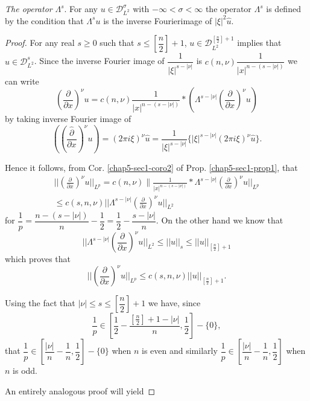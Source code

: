 \begin{defi*}
{\em The operator} $\Lambda^s$. For any $u \in 
\mathscr{D}^\sigma_{L^2}$ with $-\infty < \sigma < \infty$ the
operator $\Lambda^s$ is defined by the condition that $\Lambda^s u$ is
the inverse Fourier\pageoriginale image of $| \xi |^2 \hat{u}$. 
\end{defi*}

\begin{proof}
For any real $s \geq 0$ such that $s \leq \left[\dfrac{n}{2}\right]+ 1$, $u
\in \mathscr{D}^{[\frac{n}{2}]+1}_{L^2}$ implies that $u
\in \mathscr{D}^s_{L^2}$. Since the inverse Fourier image of
$\dfrac{1}{|\xi|^{s-| \nu |}}$ is $c(n, \nu)
\dfrac{1}{|x|^{n-(s-|\nu|)}}$ we can write   
$$
\left(\frac{\partial}{\partial x}\right)^\nu u = c(n, \nu)
\frac{1}{|x|^{n-(s-|\nu |)}}*
\left(\Lambda^{s-|\nu|}\left(\frac{\partial}{\partial x}\right)^\nu u\right)  
$$
by taking inverse Fourier image of 
$$
\left(\left( \frac{\widehat{\partial}}{\partial x}\right)^\nu u\right)
= 
(2 \pi i \xi)^\nu
\hat{u} = \frac{1}{| \xi|^{s-| \nu |}} \{ | \xi |^{s-| \nu |}(2 \pi i
\xi)^\nu \hat{u} \}. 
$$

Hence it follows, from Cor. \ref{chap5-sec1-coro2} of
Prop. \ref{chap5-sec1-prop1}, that 
\begin{gather*}
|| \left(\frac{\partial}{\partial x}\right)^\nu u ||_{L^p} = c(n, \nu )\|
\frac{1}{|x|^{n-(s-| \nu |)}}* \Lambda^{s-|\nu|}\left(\frac{\partial}{\partial
  x}\right)^\nu u||_{L^p}\\  
\leq c(s,n, \nu ) || \Lambda^{s-| \nu |}\left(\frac{\partial}{\partial
  x}\right)^\nu u ||_{L^2}  
\end{gather*}
for $\dfrac{1}{p} = \dfrac{n-(s-|\nu|)}{n} - \dfrac{1}{2}=
\dfrac{1}{2}- \dfrac{s-|\nu|}{n}$. On the other hand we know that 
$$
|| \Lambda^{s-|\nu|}\left(\frac{\partial}{\partial x}\right)^\nu u ||_{L^2} \leq
|| u ||_s \leq || u ||_{[\frac{n}{2}]+1} 
$$
which proves that 
$$
|| \left(\frac{\partial}{\partial x}\right)^\nu u ||_{L^p} \leq c(s, n, \nu)||
u||_{[\frac{n}{2}]+1}. 
$$

Using the fact that $|\nu|\leq s \leq \left[\dfrac{n}{2}\right]+1$ we have,
since 
$$
\frac{1}{p}\in \left[ \frac{1}{2}- \frac{[\frac{n}{2}]+1-|\nu 
    |}{n}, \frac{1}{2}\right]- \{0\}, 
$$\pageoriginale
that $ \dfrac{1}{p} \in \left[ \dfrac{| \nu |}{n}-
  \dfrac{1}{n}, \dfrac{1}{2} \right]- \{0\}$ when $n$ is even and
similarly $\dfrac{1}{p} \in \left[ \dfrac{| \nu |}{n}-
  \dfrac{1}{n}, \dfrac{1}{2} \right]$  when $n$ is odd. 

An entirely analogous proof will yield 
\end{proof}


